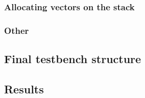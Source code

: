 \subsubsection{Allocating vectors on the stack}
\subsubsection{Other}


\subsection{Final testbench structure}

\subsection{Results}